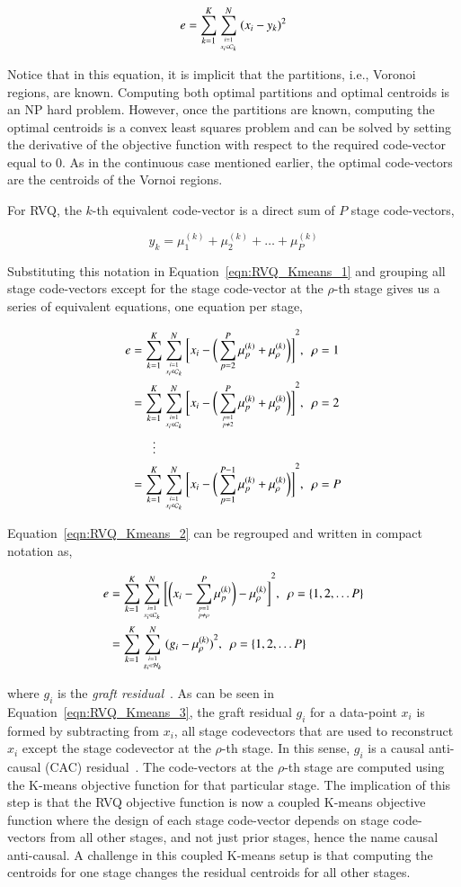 \begin{equation}
e = \sum\limits_{k=1}^K \sum\limits_{{i=1 \atop x_i \in \mathcal{C}_k}}^N {(x_i - y_k)}^2
\label{eqn:RVQ_Kmeans_1}
\end{equation}

Notice that in this equation, it is implicit that the partitions, i.e., Voronoi regions, are known.  Computing both optimal partitions and optimal centroids is an NP hard problem.  However, once the partitions are known, computing the optimal centroids is a convex least squares problem and can be solved by setting the derivative of the objective function with respect to the required code-vector equal to 0.  As in the continuous case mentioned earlier, the optimal code-vectors are the centroids of the Vornoi regions.  

For RVQ, the $k$-th equivalent code-vector is a direct sum of $P$ stage code-vectors, 

\begin{equation}
y_k = \mu_1^{(k)} + \mu_2^{(k)} + \ldots + \mu_P^{(k)}
\end{equation}

Substituting this notation in Equation~\ref{eqn:RVQ_Kmeans_1} and grouping all stage code-vectors except for the stage code-vector at the $\rho$-th stage gives us a series of equivalent equations, one equation per stage,
 
\begin{align}
e&= \KmeansSum{\bigg[\RVQmultipleKmeansone\bigg]}^2, \ \ \rho=1\notag\\
&= \KmeansSum{\bigg[\RVQmultipleKmeanstwo\bigg]}^2, \ \ \rho=2\notag\\
&\ \ \ \  \ \ \ \vdots\notag\\
&=\KmeansSum{\bigg[\RVQmultipleKmeansT\bigg]}^2, \ \ \rho=P
\label{eqn:RVQ_Kmeans_2}
\end{align}


Equation~\ref{eqn:RVQ_Kmeans_2} can be regrouped and written in compact notation as,

\begin{align}
e&= \KmeansSum{\bigg[\RVQmultipleKmeansonealternate\bigg]}^2, \ \ \rho=\{1, 2, \ldots P\}\notag\\
&={\RVQerroralternate}, \ \ \rho=\{1, 2, \ldots P\}
\label{eqn:RVQ_Kmeans_3}
\end{align}

where $g_i$ is the \emph{graft residual}~\cite{1993_JNL_RVQDSC_Barnes}.   As can be seen in Equation~\ref{eqn:RVQ_Kmeans_3}, the graft residual $g_i$ for a data-point $x_i$ is formed by subtracting from $x_i$, all stage codevectors that are used to reconstruct $x_i$ except the stage codevector at the $\rho$-th stage.  In this sense, $g_i$ is a causal anti-causal (CAC) residual~\cite{1993_JNL_RVQDSC_Barnes}.  The code-vectors at the $\rho$-th stage are computed using the K-means objective function for that particular stage.  The implication of this step is that the RVQ objective function is now a coupled K-means objective function where the design of each stage code-vector depends on stage code-vectors from all other stages, and not just prior stages, hence the name causal anti-causal.    A challenge in this coupled K-means setup is that computing the centroids for one stage changes the residual centroids for all other stages.  


